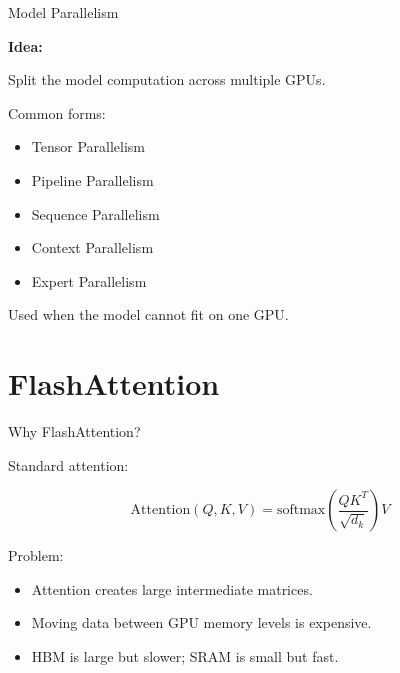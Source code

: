 \documentclass[aspectratio=169]{beamer}
\begin{document}
\begin{frame}{Model Parallelism}

\textbf{Idea:}

Split the model computation across multiple GPUs.

\vspace{0.5cm}

Common forms:

\begin{itemize}
    \item Tensor Parallelism
    \item Pipeline Parallelism
    \item Sequence Parallelism
    \item Context Parallelism
    \item Expert Parallelism
\end{itemize}

\vspace{0.4cm}

Used when the model cannot fit on one GPU.

\end{frame}

\section{FlashAttention}

\begin{frame}{Why FlashAttention?}

Standard attention:

\[
\mathrm{Attention}(Q,K,V)
=
\mathrm{softmax}
\left(
\frac{QK^T}{\sqrt{d_k}}
\right)V
\]

\vspace{0.5cm}

Problem:

\begin{itemize}
    \item Attention creates large intermediate matrices.
    \item Moving data between GPU memory levels is expensive.
    \item HBM is large but slower; SRAM is small but fast.
\end{itemize}

\end{frame}
\end{document}
